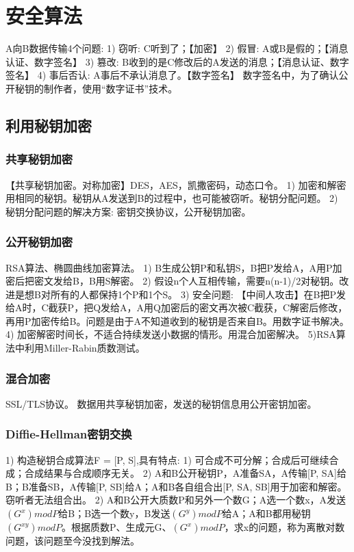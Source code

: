 \documentclass[UTF8]{../computerUniverse}
\begin{document}
\section{安全算法}

A向B数据传输4个问题: 
1) 窃听: C听到了；【加密】
2) 假冒: A或B是假的；【消息认证、数字签名】
3) 篡改: B收到的是C修改后的A发送的消息；【消息认证、数字签名】
4) 事后否认: A事后不承认消息了。【数字签名】
数字签名中，为了确认公开秘钥的制作者，使用“数字证书”技术。



\subsection{利用秘钥加密}

\subsubsection{共享秘钥加密}
【共享秘钥加密。对称加密】DES，AES，凯撒密码，动态口令。
1) 加密和解密用相同的秘钥。秘钥从A发送到B的过程中，也可能被窃听。秘钥分配问题。
2) 秘钥分配问题的解决方案: 密钥交换协议，公开秘钥加密。


\subsubsection{公开秘钥加密}
RSA算法、椭圆曲线加密算法。
1) B生成公钥P和私钥S，B把P发给A，A用P加密后把密文发给B，B用S解密。
2) 假设n个人互相传输，需要n(n-1)/2对秘钥。改进是想B对所有的人都保持1个P和1个S。
3) 安全问题: 【中间人攻击】在B把P发给A时，C截获P，把Q发给A，A用Q加密后的密文再次被C截获，C解密后修改，再用P加密传给B。问题是由于A不知道收到的秘钥是否来自B。用数字证书解决。
4) 加密解密时间长，不适合持续发送小数据的情形。用混合加密解决。
5)RSA算法中利用Miller-Rabin质数测试。


\subsubsection{混合加密}
SSL/TLS协议。
数据用共享秘钥加密，发送的秘钥信息用公开密钥加密。


\subsubsection{Diffie-Hellman密钥交换}
1) 构造秘钥合成算法F = [P, S],具有特点: 1) 可合成不可分解；合成后可继续合成；合成结果与合成顺序无关。
2) A和B公开秘钥P，A准备SA，A传输[P, SA]给B；B准备SB，A传输[P, SB]给A；A和B各自组合出[P, SA, SB]用于加密和解密。窃听者无法组合出。
2) A和B公开大质数P和另外一个数G；A选一个数x，A发送$(G^x)modP$给B；B选一个数y，B发送$(G^y)modP$给A；A和B都用秘钥$(G^{xy})modP$。根据质数P、生成元G、$(G^x)modP$，求x的问题，称为离散对数问题，该问题至今没找到解法。
\end{document}
